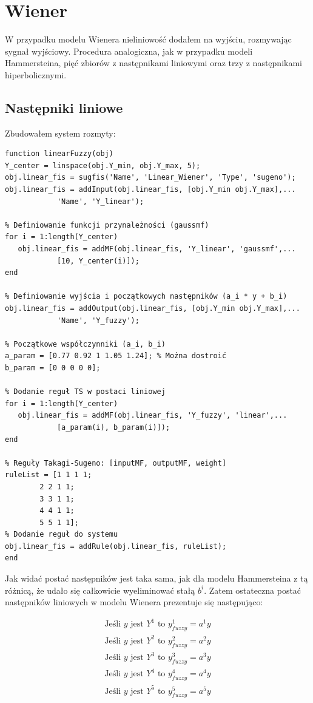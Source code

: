 \chapter{Wiener}
W przypadku modelu Wienera nieliniowość dodałem na wyjściu, rozmywając sygnał wyjściowy. Procedura analogiczna, jak w przypadku modeli Hammersteina, pięć zbiorów z następnikami liniowymi oraz trzy z następnikami hiperbolicznymi.

\section{Następniki liniowe}
Zbudowałem system rozmyty:

\begin{lstlisting}[style=Matlab-editor]
function linearFuzzy(obj)
Y_center = linspace(obj.Y_min, obj.Y_max, 5);
obj.linear_fis = sugfis('Name', 'Linear_Wiener', 'Type', 'sugeno');
obj.linear_fis = addInput(obj.linear_fis, [obj.Y_min obj.Y_max],...
			'Name', 'Y_linear');
            
% Definiowanie funkcji przynależności (gaussmf)
for i = 1:length(Y_center) 
   obj.linear_fis = addMF(obj.linear_fis, 'Y_linear', 'gaussmf',...
   			[10, Y_center(i)]);
end
            
% Definiowanie wyjścia i początkowych następników (a_i * y + b_i)
obj.linear_fis = addOutput(obj.linear_fis, [obj.Y_min obj.Y_max],...
			'Name', 'Y_fuzzy');
            
% Początkowe współczynniki (a_i, b_i)
a_param = [0.77 0.92 1 1.05 1.24]; % Można dostroić
b_param = [0 0 0 0 0];
            
% Dodanie reguł TS w postaci liniowej
for i = 1:length(Y_center)
   obj.linear_fis = addMF(obj.linear_fis, 'Y_fuzzy', 'linear',...
   			[a_param(i), b_param(i)]);
end
            
% Reguły Takagi-Sugeno: [inputMF, outputMF, weight]
ruleList = [1 1 1 1;
	    2 2 1 1;
	    3 3 1 1;
	    4 4 1 1;
	    5 5 1 1];         
% Dodanie reguł do systemu
obj.linear_fis = addRule(obj.linear_fis, ruleList);
end
\end{lstlisting}

\newpage

Jak widać postać następników jest taka sama, jak dla modelu Hammersteina z tą różnicą, że udało się całkowicie wyeliminować stałą $b^i$. Zatem ostateczna postać następników liniowych w modelu Wienera prezentuje się następująco:

\begin{equation}
\begin{array}{c}
\text{Jeśli } y \text{ jest } Y^1 \text{ to } y^1_{fuzzy}=a^1y \\[1.5ex]
\text{Jeśli } y \text{ jest } Y^2 \text{ to } y^2_{fuzzy}=a^2y \\[1.5ex]
\text{Jeśli } y \text{ jest } Y^3 \text{ to } y^3_{fuzzy}=a^3y \\[1.5ex]
\text{Jeśli } y \text{ jest } Y^4 \text{ to } y^4_{fuzzy}=a^4y \\[1.5ex]
\text{Jeśli } y \text{ jest } Y^5 \text{ to } y^5_{fuzzy}=a^5y \\[1.5ex]
\end{array}
\end{equation}

